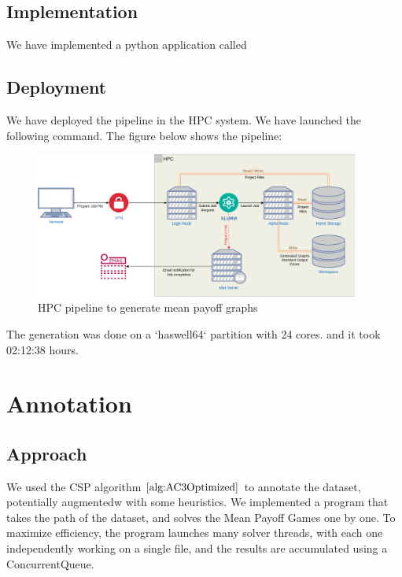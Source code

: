 \subsection{Implementation}
We have implemented a python application called 
\subsection{Deployment}
We have deployed the pipeline in the HPC system. We have launched the following command.
\newline The figure below shows the pipeline:
\begin{figure}
	\centering
	\includegraphics[width=0.95\textwidth]{Figures/DatasetGeneration.png}
	\caption{HPC pipeline to generate mean payoff graphs}
\end{figure}
The generation was done on a `haswell64` partition with 24 cores. and it took 02:12:38 hours.

\section{Annotation}
\subsection{Approach}
We used the CSP algorithm $\ref{alg:AC3Optimized}$ to annotate the dataset, potentially augmentedw with some heuristics. 
\newline We implemented a program that takes the path of the dataset, and solves the Mean Payoff Games one by one.
\newline To maximize efficiency, the program launches many solver threads, with each one independently working on a single file, and the results are accumulated using a ConcurrentQueue.
